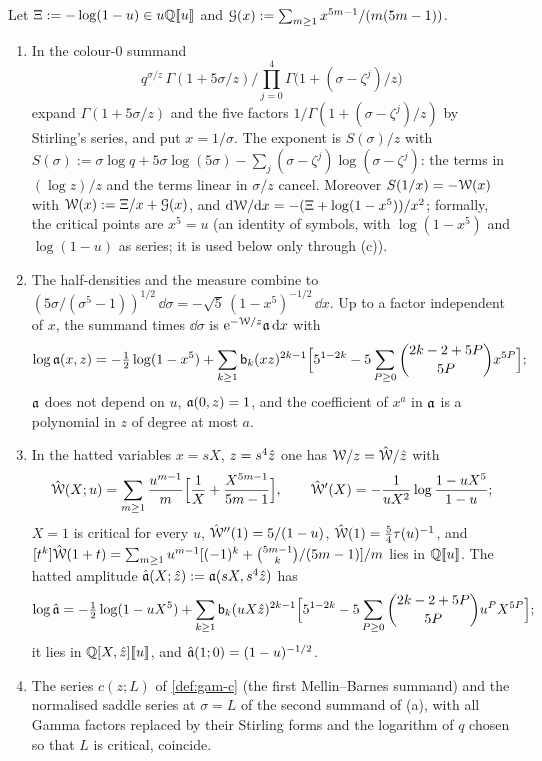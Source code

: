\begin{lem}
\label{lem:con-form}
Let $\Xi:=-\log(1-u)\in u\mathbb{Q}[\![ u ]\!]$ and $\mathcal{G}(x):=\sum_{m\geq1}x^{5m-1}/(m(5m-1))$.
\begin{enumerate}
\item[(a)] In the colour-$0$ summand
\[
q^{\sigma/z}\,\Gamma(1+5\sigma/z)\Big/\prod_{j=0}^4\Gamma\bigl(1+(\sigma-\zeta^j)/z\bigr)
\]
expand $\Gamma(1+5\sigma/z)$ and the five factors $1/\Gamma(1+(\sigma-\zeta^j)/z)$ by Stirling's series, and put $x=1/\sigma$. The exponent is $S(\sigma)/z$ with $S(\sigma):=\sigma\log q+5\sigma\log(5\sigma)-\sum_j(\sigma-\zeta^j)\log(\sigma-\zeta^j)$: the terms in $(\log z)/z$ and the terms linear in $\sigma/z$ cancel. Moreover $S(1/x)=-\mathcal{W}(x)$ with $\mathcal{W}(x):=\Xi/x+\mathcal{G}(x)$, and $\mathrm{d}\mathcal{W}/\mathrm{d} x=-(\Xi+\log(1-x^5))/x^2$; formally, the critical points are $x^5=u$ (an identity of symbols, with $\log(1-x^5)$ and $\log(1-u)$ as series; it is used below only through (c)).
\item[(b)] The half-densities and the measure combine to $(5\sigma/(\sigma^5-1))^{1/2}\,\dd\sigma=-\sqrt5\,(1-x^5)^{-1/2}\,\dd x$. Up to a factor independent of $x$, the summand times $\dd\sigma$ is $\mathrm{e}^{-\mathcal{W}/z}\mathfrak{a}\,\mathrm{d} x$ with
\[
\log\mathfrak{a}(x,z)=-\tfrac12\log(1-x^5)+\sum_{k\geq1}\mathsf{b}_k(xz)^{2k-1}\Bigl[5^{1-2k}-5\sum_{P\geq0}\binom{2k-2+5P}{5P}x^{5P}\Bigr];
\]
$\mathfrak{a}$ does not depend on $u$, $\mathfrak{a}(0,z)=1$, and the coefficient of $x^a$ in $\mathfrak{a}$ is a polynomial in $z$ of degree at most $a$.
\item[(c)] In the hatted variables $x=sX$, $z=s^4\hat{z}$ one has $\mathcal{W}/z=\hat{\mathcal{W}}/\hat{z}$ with
\[
\hat{\mathcal{W}}(X;u)=\sum_{m\geq1}\frac{u^{m-1}}m\Bigl[\frac1X+\frac{X^{5m-1}}{5m-1}\Bigr],\qquad \hat{\mathcal{W}}'(X)=-\frac1{uX^2}\log\frac{1-uX^5}{1-u};
\]
$X=1$ is critical for every $u$, $\hat{\mathcal{W}}''(1)=5/(1-u)$, $\hat{\mathcal{W}}(1)=\frac54\tau(u)^{-1}$, and $[t^k]\hat{\mathcal{W}}(1+t)=\sum_{m\geq1}u^{m-1}[(-1)^k+\binom{5m-1}{k}/(5m-1)]/m$ lies in $\mathbb{Q}[\![ u ]\!]$. The hatted amplitude $\hat{\mathfrak{a}}(X;\hat{z}):=\mathfrak{a}(sX,s^4\hat{z})$ has
\[
\log\hat{\mathfrak{a}}=-\tfrac12\log(1-uX^5)+\sum_{k\geq1}\mathsf{b}_k(uX\hat{z})^{2k-1}\Bigl[5^{1-2k}-5\sum_{P\geq0}\binom{2k-2+5P}{5P}u^PX^{5P}\Bigr];
\]
it lies in $\mathbb{Q}[X,\hat{z}][\![ u ]\!]$, and $\hat{\mathfrak{a}}(1;0)=(1-u)^{-1/2}$.
\item[(d)] The series $c(z;L)$ of \cref{def:gam-c} (the first Mellin--Barnes summand) and the normalised saddle series at $\sigma=L$ of the second summand of (a), with all Gamma factors replaced by their Stirling forms and the logarithm of $q$ chosen so that $L$ is critical, coincide.
\end{enumerate}
\end{lem}



